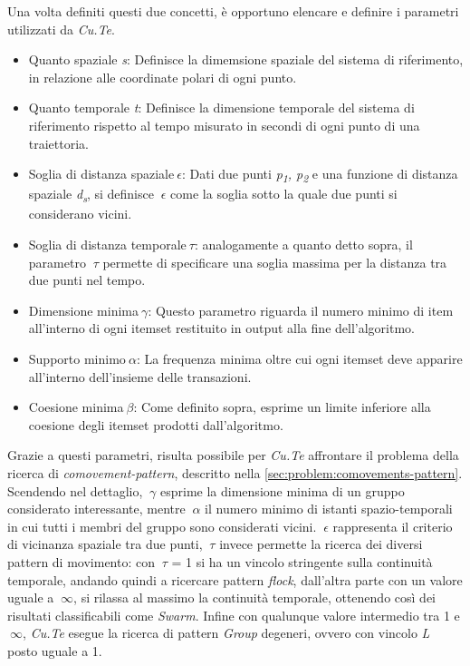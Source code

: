 Una volta definiti questi due concetti, è opportuno elencare e definire i parametri
utilizzati da \textit{Cu.Te}.

\begin{itemize}

  \item Quanto spaziale \textit{s}:
  Definisce la dimemsione spaziale del sistema di riferimento, in relazione alle coordinate polari di ogni punto.

  \item Quanto temporale \textit{t}:
  Definisce la dimensione temporale del sistema di riferimento rispetto al tempo misurato in secondi di ogni punto di una traiettoria.
  \item Soglia di distanza spaziale\(~\epsilon \):
  Dati due punti \textit{p\textsubscript{1}, p\textsubscript{2}} e una funzione di distanza spaziale \textit{d\textsubscript{s}},
  si definisce \(~\epsilon \) come la soglia sotto la quale due punti si considerano vicini.
  \item Soglia di distanza temporale\(~\tau \): analogamente a quanto detto sopra, il parametro \(~\tau \) permette di specificare
  una soglia massima per la distanza tra due punti nel tempo.
  \item Dimensione minima\(~\gamma \): Questo parametro riguarda il numero minimo di item all'interno di ogni itemset restituito in output alla fine dell'algoritmo.
  \item Supporto minimo\(~\alpha \): La frequenza minima oltre cui ogni itemset deve apparire all'interno dell'insieme delle transazioni.
  \item Coesione minima\(~\beta \): Come definito sopra, esprime un limite inferiore alla coesione degli itemset prodotti dall'algoritmo.

\end{itemize}

Grazie a questi parametri, risulta possibile per \textit{Cu.Te} affrontare il problema
della ricerca di \textit{comovement-pattern}, descritto nella \cref{sec:problem:comovements-pattern}.
Scendendo nel dettaglio, \(~\gamma \) esprime la dimensione minima di un gruppo considerato interessante, mentre
\(~\alpha \) il numero minimo di istanti spazio-temporali in cui tutti i membri del gruppo sono considerati vicini.
\(~\epsilon \) rappresenta il criterio di vicinanza spaziale tra due punti, \(~\tau \) invece permette la ricerca dei diversi pattern di movimento:
con \(~\tau \) = 1 si ha un vincolo stringente sulla continuità temporale, andando quindi a ricercare pattern \textit{flock},
dall'altra parte con un valore uguale a \(~\infty \), si rilassa al massimo la continuità temporale, ottenendo
così dei risultati classificabili come \textit{Swarm}. Infine con qualunque valore intermedio tra 1 e  \(~\infty \),
\textit{Cu.Te} esegue la ricerca di pattern \textit{Group} degeneri, ovvero con vincolo \textit{L} posto uguale a 1.



